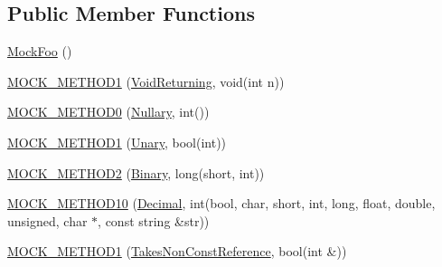 \subsection*{Public Member Functions}
\begin{DoxyCompactItemize}
\item 
\hyperlink{classtesting_1_1gmock__generated__function__mockers__test_1_1MockFoo_a05d4aeb00d75b5dbf627a5db2c0ada7f}{Mock\+Foo} ()
\item 
\hyperlink{classtesting_1_1gmock__generated__function__mockers__test_1_1MockFoo_a03e7f723e9909b031fc6df22f41aac7f}{M\+O\+C\+K\+\_\+\+M\+E\+T\+H\+O\+D1} (\hyperlink{classtesting_1_1gmock__generated__function__mockers__test_1_1FooInterface_adf968115cf1260004d8abe372dc71c85}{Void\+Returning}, void(int n))
\item 
\hyperlink{classtesting_1_1gmock__generated__function__mockers__test_1_1MockFoo_a25b99ec3b994318b7ecb0578da113136}{M\+O\+C\+K\+\_\+\+M\+E\+T\+H\+O\+D0} (\hyperlink{classtesting_1_1gmock__generated__function__mockers__test_1_1FooInterface_a633e753eafa7f82dde22ecf9492f341c}{Nullary}, int())
\item 
\hyperlink{classtesting_1_1gmock__generated__function__mockers__test_1_1MockFoo_a9f9ce709a5b13e319eeb348e6eae3d18}{M\+O\+C\+K\+\_\+\+M\+E\+T\+H\+O\+D1} (\hyperlink{classtesting_1_1gmock__generated__function__mockers__test_1_1FooInterface_ae0885ac29bc4a3f180f6573d8b1a341e}{Unary}, bool(int))
\item 
\hyperlink{classtesting_1_1gmock__generated__function__mockers__test_1_1MockFoo_a50f8c94d6fab258d49e1d4a15ea7a7af}{M\+O\+C\+K\+\_\+\+M\+E\+T\+H\+O\+D2} (\hyperlink{classtesting_1_1gmock__generated__function__mockers__test_1_1FooInterface_a59ea28b711ece054ce9d57c2dc574ba0}{Binary}, long(short, int))
\item 
\hyperlink{classtesting_1_1gmock__generated__function__mockers__test_1_1MockFoo_aeb9b35bc4054018f6a80c811a58404e3}{M\+O\+C\+K\+\_\+\+M\+E\+T\+H\+O\+D10} (\hyperlink{classtesting_1_1gmock__generated__function__mockers__test_1_1FooInterface_a5c5886880581d8dd420c9a187ff884b2}{Decimal}, int(bool, char, short, int, long, float, double, unsigned, char $\ast$, const string \&str))
\item 
\hyperlink{classtesting_1_1gmock__generated__function__mockers__test_1_1MockFoo_a785cbef820189a974170cea52b0d97d9}{M\+O\+C\+K\+\_\+\+M\+E\+T\+H\+O\+D1} (\hyperlink{classtesting_1_1gmock__generated__function__mockers__test_1_1FooInterface_a694354adfffcee58093298bc12182ff5}{Takes\+Non\+Const\+Reference}, bool(int \&))

\end{DoxyCompactItemize}
